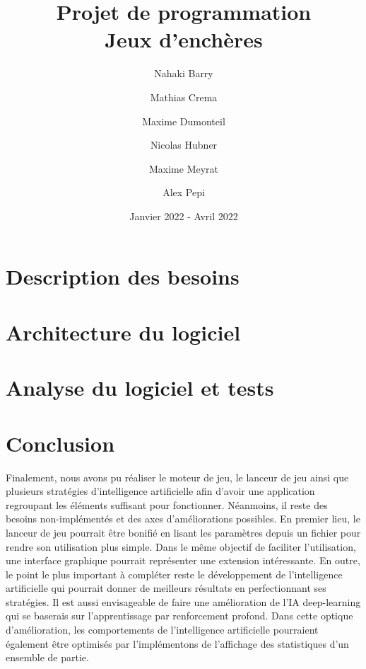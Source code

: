\documentclass{article}
\begin{document}
\title{\textbf{Projet de programmation \\ \bigskip Jeux d'enchères}}
\date{Janvier 2022 - Avril 2022}
\author{Nahaki Barry \and Mathias Crema \and Maxime Dumonteil \and Nicolas Hubner \and Maxime Meyrat \and Alex Pepi}

\maketitle
\newpage

\renewcommand{\contentsname}{Sommaire}
\tableofcontents
\cleardoublepage
 
\newpage
 
\renewcommand{\listfigurename}{Liste des figures}
\listoffigures
 
\newpage



\newpage

\section{Description des besoins}


\newpage

\section{Architecture du logiciel}


\newpage

\section{Analyse du logiciel et tests}


\section{Conclusion}
Finalement, nous avons pu réaliser le moteur de jeu, le lanceur de jeu ainsi que plusieurs stratégies d'intelligence artificielle afin d'avoir une application regroupant les éléments suffisant pour fonctionner. Néanmoins, il reste des besoins non-implémentés et des axes d'améliorations possibles. En premier lieu, le lanceur de jeu pourrait être bonifié en lisant les paramètres depuis un fichier pour rendre son utilisation plus simple. Dans le même objectif de faciliter l'utilisation, une interface graphique pourrait représenter une extension intéressante. En outre, le point le plus important à compléter reste le développement de l'intelligence artificielle qui pourrait donner de meilleurs résultats en perfectionnant ses stratégies. Il est aussi envisageable de faire une amélioration de l'IA deep-learning qui se baserais sur l'apprentissage par renforcement profond. Dans cette optique d'amélioration, les comportements de l'intelligence artificielle pourraient également être optimisés par l'implémentons de l'affichage des statistiques d'un ensemble de partie.
\end{document}
